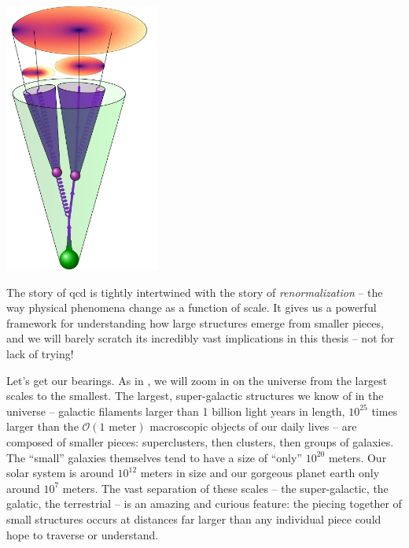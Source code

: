 \begin{sourcefigure}[t!]
    \centering
    \includegraphics[width=0.38\textwidth, angle=-50]{figures/picturebook/fractal-substructure}

    \caption{
        Energy-weighted correlators capture correlations between high-energy structures within jets, such as particles (black lines) or subjets (purple cones), as probed by the resolved 3-point energy correlators of  visualized by the colored disks above the jet.
        The higher energy regions of the cartoon jet depicted here are represented by higher values of the associated resolved energy correlator, and darker colors in the associated colored disks.
    }
    \label{fig:picturebook_eventshapes}
\end{sourcefigure}




The story of \gls{qcd} is tightly intertwined with the story of \textit{renormalization} -- the way physical phenomena change as a function of scale.
%
It gives us a powerful framework for understanding how large structures emerge from smaller pieces, and we will barely scratch its incredibly vast implications in this thesis -- not for lack of trying!

Let's get our bearings.
%
As in , we will zoom in on the universe from the largest scales to the smallest.
%
The largest, super-galactic structures we know of in the universe -- galactic filaments larger than 1 billion light years in length, \(10^{25}\) times larger than the \(\mathcal{O}(1 \text{ meter})\) macroscopic objects of our daily lives -- are composed of smaller pieces:
%
superclusters, then clusters, then groups of galaxies.
%
The ``small'' galaxies themselves tend to have a size of ``only'' \(10^{20}\) meters.
%
Our solar system is around \(10^{12}\) meters in size and our gorgeous planet earth only around \(10^7\) meters.
%
The vast separation of these scales -- the super-galactic, the galatic, the terrestrial -- is an amazing and curious feature:
%
the piecing together of small structures occurs at distances far larger than any individual piece could hope to traverse or understand.



